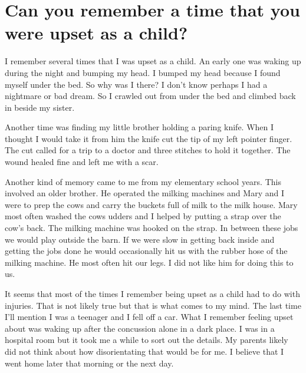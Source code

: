 \section{Can you remember a time that you were upset as a child?}
I remember several times that I was upset as a child.
An early one was waking up during the night and bumping my head.
I bumped my head because I found myself under the bed.
So why was I there? I don't know perhaps I had a nightmare or bad dream.
So I crawled out from under the bed and climbed back in beside my sister.

Another time was finding my little brother holding a paring knife.
When I thought I would take it from him the knife cut the tip of my left pointer finger.
The cut called for a trip to a doctor and three stitches to hold it together.
The wound healed fine and left me with a scar.

Another kind of memory came to me from my elementary school years.
This involved an older brother.
He operated the milking machines and Mary and I were to prep the cows and carry the buckets full of milk to the milk house.
Mary most often washed the cows udders and I helped by putting a strap over the cow's back.
The milking machine was hooked on the strap.
In between these jobs we would play outside the barn.
If we were slow in getting back inside and getting the jobs done he would occasionally hit us with the rubber hose of the milking machine.
He most often hit our legs.
I did not like him for doing this to us.

It seems that most of the times I remember being upset as a child had to do with injuries.
That is not likely true but that is what comes to my mind.
The last time I'll mention I was a teenager and I fell off a car.
What I remember feeling upset about was waking up after the concussion alone in a dark place.
I was in a hospital room but it took me a while to sort out the details.
My parents likely did not think about how disorientating that would be for me.
I believe that I went home later that morning or the next day.







